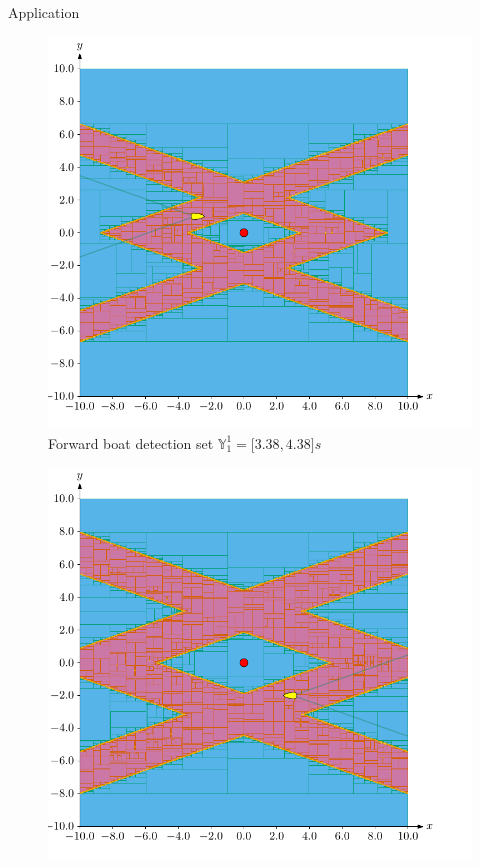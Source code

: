 \documentclass{beamer}
\begin{document}
            \begin{frame}{Application}
                \begin{minipage}{0.45\textwidth}
                    \begin{figure}
                            \includegraphics[width=\textwidth]{imgs/forward}
                            \caption{Forward boat detection set $\mathbb{Y}_1^1 = \lbrack3.38, 4.38\rbrack s$}
                    \end{figure}
                \end{minipage}
                \hfill
                \begin{minipage}{0.45\textwidth}
                    \begin{figure}
                            \includegraphics[width=\textwidth]{imgs/backward}

\end{figure}
\end{minipage}
\end{frame}
\end{document}
